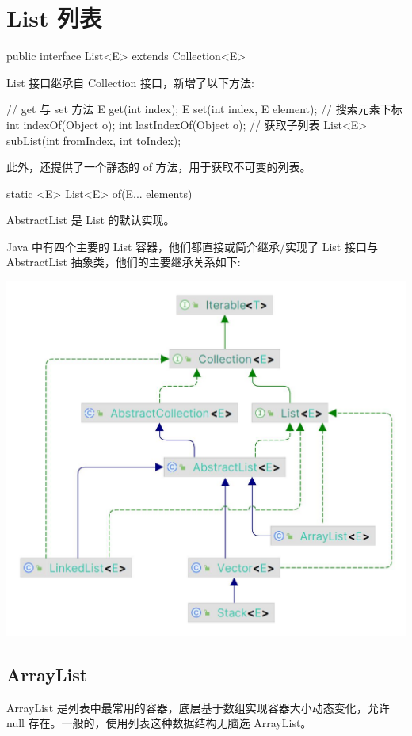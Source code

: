 \section{List 列表}

\begin{Java}
public interface List<E> extends Collection<E>
\end{Java}

List 接口继承自 Collection 接口，新增了以下方法:

\begin{Java}
// get 与 set 方法
E get(int index);
E set(int index, E element);
// 搜索元素下标
int indexOf(Object o);
int lastIndexOf(Object o);
// 获取子列表
List<E> subList(int fromIndex, int toIndex);
\end{Java}

此外，还提供了一个静态的 of 方法，用于获取不可变的列表。

\begin{Java}
static <E> List<E> of(E... elements)
\end{Java}

AbstractList 是 List 的默认实现。

Java 中有四个主要的 List 容器，他们都直接或简介继承/实现了 List 接口与 AbstractList 抽象类，他们的主要继承关系如下:

\begin{center}
    \includegraphics[width=0.6\linewidth]{../../../imgs/List.jpg}
\end{center}

\subsection{ArrayList}

ArrayList 是列表中最常用的容器，底层基于数组实现容器大小动态变化，允许 null 存在。一般的，使用列表这种数据结构无脑选 ArrayList。

